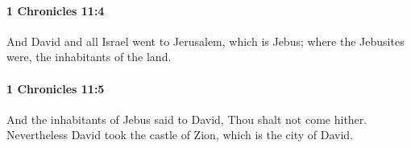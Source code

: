 		\paragraph{1 Chronicles 11:4} %
			\label{1CHRONICLES-11-4}

			And David and all Israel went to Jerusalem, which is Jebus; where the Jebusites were, the inhabitants of the land.


		\paragraph{1 Chronicles 11:5} %
			\label{1CHRONICLES-11-5}

			And the inhabitants of Jebus said to David, Thou shalt not come hither. Nevertheless David took the castle of Zion, which is the city of David.


